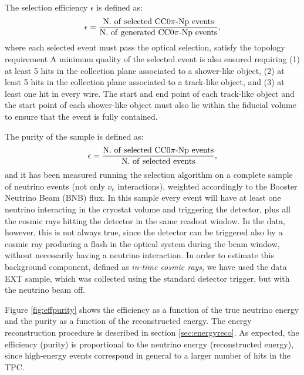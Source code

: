 \documentclass[a4paper]{article}
\begin{document}
The selection efficiency $\epsilon$ is defined as:
\begin{equation}
\epsilon = \frac{\mathrm{N.~of~selected~CC0}\pi\mathrm{{\text -}Np~events}}{\mathrm{N.~of~generated~CC0}\pi\mathrm{{\text -}Np~events}},
\end{equation}
where each selected event must pass the optical selection, satisfy the topology requirement A minimum quality of the selected event is also ensured requiring (1) at least 5 hits in the collection plane associated to a shower-like object, (2) at least 5 hits in the collection plane associated to a track-like object, and (3) at least one hit in every wire.
The start and end point of each track-like object and the start point of each shower-like object must also lie within the fiducial volume to ensure that the event is fully contained.

The purity of the sample is defined as:
\begin{equation}
\epsilon = \frac{\mathrm{N.~of~selected~CC0}\pi\mathrm{{\text -}Np~events}}{\mathrm{N.~of~selected~events}},
\end{equation}
and it has been measured running the selection algorithm on a complete sample of neutrino events (not only $\nu_{e}$ interactions), weighted accordingly to the Booster Neutrino Beam (BNB) flux. In this sample every event will have at least one neutrino interacting in the cryostat volume and triggering the detector, plus all the cosmic rays hitting the detector in the same readout window. In the data, however, this is not always true, since the detector can be triggered also by a cosmic ray producing a flash in the optical system during the beam window, without necessarily having a neutrino interaction. In order to estimate this background component, defined as \emph{in-time cosmic rays}, we have used the data EXT sample, which was collected using the standard detector trigger, but with the neutrino beam off.

Figure \ref{fig:effpurity} shows the efficiency as a function of the true neutrino energy and the purity as a function of the reconstructed energy. The energy reconstruction procedure is described in section \ref{sec:energyreco}.
As expected, the efficiency (purity) is proportional to the neutrino energy (reconstructed energy), since high-energy events correspond in general to a larger number of hits in the TPC. 
\end{document}
